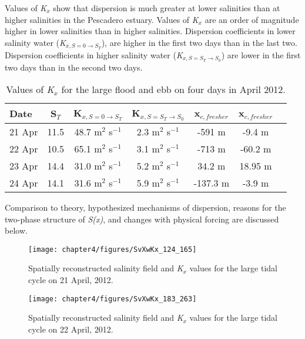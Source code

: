 Values of \emph{K$_x$} show that dispersion is much greater at lower salinities than at higher salinities in the Pescadero estuary.  Values of \emph{K$_x$} are an order of magnitude higher in lower salinities than in higher salinities. Dispersion coefficients in lower salinity water (\emph{K$_{x,S=0 \rightarrow S_T}$}), are higher in the first two days than in the last two. Dispersion coefficients in higher salinity water (\emph{K$_{x,S=S_T \rightarrow S_0}$}) are lower in the first two days than in the second two days. 

\begin{table}[h]
\renewcommand{\arraystretch}{1.3}

	\begin{center}
		\begin{tabular}{| l || c | c | c | c | c | c |}
		\hline
		Date & S$_{T}$ & K$_{x,S=0 \rightarrow S_T}$ &  K$_{x,S=S_T \rightarrow S_0}$ & x$_{c,fresher}$ & x$_{c,fresher}$\\
		\hline \hline
		21 Apr & 11.5 & 48.7 m$^2$ s$^{-1}$ & 2.3 m$^2$ s$^{-1}$ & -591 m & -9.4 m\\ 
		22 Apr & 10.5 & 65.1 m$^2$ s$^{-1}$ & 3.1 m$^2$ s$^{-1}$ & -713 m & -60.2 m\\ 
		23 Apr & 14.4 & 31.0 m$^2$ s$^{-1}$ & 5.2 m$^2$ s$^{-1}$ & 34.2 m & 18.95 m\\ 
		24 Apr & 14.1 & 31.6 m$^2$ s$^{-1}$ & 5.9 m$^2$ s$^{-1}$ & -137.3 m & -3.9 m\\  \hline 
	\end{tabular}
	\caption{Values of \emph{K$_x$} for the large flood and ebb on four days  in April 2012.}\label{tab:Kxtable}
\end{center}
\end{table}


Comparison to theory, hypothesized mechanisms of dispersion, reasons for the two-phase structure of \emph{S(x)}, and changes with physical forcing are discussed below. 
\begin{figure}[hp]
\centering
	\texttt{[image: chapter4/figures/SvXwKx\_124\_165]} 
\caption{Spatially reconstructed salinity field and \emph{K$_x$} values for the large tidal cycle on 21 April, 2012. } \label{fig:Kx421}
\end{figure}

\begin{figure}[hp]
\centering
	\texttt{[image: chapter4/figures/SvXwKx\_183\_263]} 
\caption{Spatially reconstructed salinity field and \emph{K$_x$} values for the large tidal cycle on 22 April, 2012. } \label{fig:Kx422}
\end{figure}

